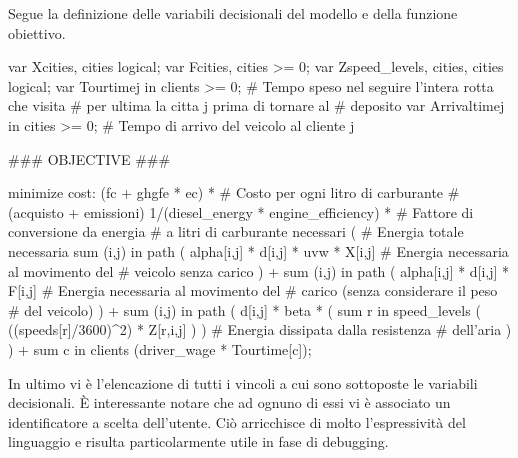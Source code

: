 		Segue la definizione delle variabili decisionali del modello e della funzione obiettivo.

		\begin{amplcode}
			var X{cities, cities} logical;
			var F{cities, cities} >= 0;
			var Z{speed_levels, cities, cities} logical;
			var Tourtime{j in clients} >= 0;	
									# Tempo speso nel seguire l’intera rotta che visita 
									# per ultima la citta j prima di tornare al
			# deposito
			var Arrivaltime{j in cities} >= 0;
									# Tempo di arrivo del veicolo al cliente j
												
			### OBJECTIVE ###

			minimize cost:
				(fc + ghgfe * ec) *	# Costo per ogni litro di carburante
									# (acquisto + emissioni) 
				1/(diesel_energy * engine_efficiency) *
									# Fattore di conversione da energia
									# a litri di carburante necessari
				(					# Energia totale necessaria
					sum {(i,j) in path} (
						alpha[i,j] * d[i,j] * uvw * X[i,j]
									# Energia necessaria al movimento del
									# veicolo senza carico
					) +
					sum {(i,j) in path} (
						alpha[i,j] * d[i,j] * F[i,j]
									# Energia necessaria al movimento del
									# carico (senza considerare il peso 
									# del veicolo)
					) + 
					sum {(i,j) in path} (
						d[i,j] * beta * (
							sum {r in speed_levels} (
								((speeds[r]/3600)^2) * Z[r,i,j] 
							)
						)			# Energia dissipata dalla resistenza 
									# dell'aria
					)
				) + 
				sum {c in clients} (driver_wage * Tourtime[c]);
		\end{amplcode}

		In ultimo vi è l’elencazione di tutti i vincoli a cui sono sottoposte le variabili decisionali. È interessante notare che ad ognuno di essi vi è associato un identificatore a scelta dell’utente. Ciò arricchisce di molto l’espressività del linguaggio e risulta particolarmente utile in fase di debugging.

